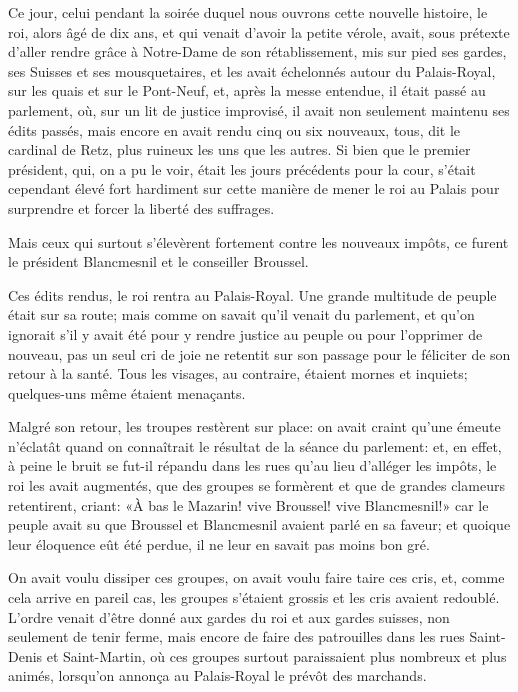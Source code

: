 Ce jour, celui pendant la soirée duquel nous ouvrons cette nouvelle histoire, le roi, alors âgé de dix ans, et qui venait d'avoir la petite vérole, avait, sous prétexte d'aller rendre grâce à Notre-Dame de son rétablissement, mis sur pied ses gardes, ses Suisses et ses mousquetaires, et les avait échelonnés autour du Palais-Royal, sur les quais et sur le Pont-Neuf, et, après la messe entendue, il était passé au parlement, où, sur un lit de justice improvisé, il avait non seulement maintenu ses édits passés, mais encore en avait rendu cinq ou six nouveaux, tous, dit le cardinal de Retz, plus ruineux les uns que les autres. Si bien que le premier président, qui, on a pu le voir, était les jours précédents pour la cour, s'était cependant élevé fort hardiment sur cette manière de mener le roi au Palais pour surprendre et forcer la liberté des suffrages.

Mais ceux qui surtout s'élevèrent fortement contre les nouveaux impôts, ce furent le président Blancmesnil et le conseiller Broussel.

Ces édits rendus, le roi rentra au Palais-Royal. Une grande multitude de peuple était sur sa route; mais comme on savait qu'il venait du parlement, et qu'on ignorait s'il y avait été pour y rendre justice au peuple ou pour l'opprimer de nouveau, pas un seul cri de joie ne retentit sur son passage pour le féliciter de son retour à la santé. Tous les visages, au contraire, étaient mornes et inquiets; quelques-uns même étaient menaçants.

Malgré son retour, les troupes restèrent sur place: on avait craint qu'une émeute n'éclatât quand on connaîtrait le résultat de la séance du parlement: et, en effet, à peine le bruit se fut-il répandu dans les rues qu'au lieu d'alléger les impôts, le roi les avait augmentés, que des groupes se formèrent et que de grandes clameurs retentirent, criant: «À bas le Mazarin! vive Broussel! vive Blancmesnil!» car le peuple avait su que Broussel et Blancmesnil avaient parlé en sa faveur; et quoique leur éloquence eût été perdue, il ne leur en savait pas moins bon gré.

On avait voulu dissiper ces groupes, on avait voulu faire taire ces cris, et, comme cela arrive en pareil cas, les groupes s'étaient grossis et les cris avaient redoublé. L'ordre venait d'être donné aux gardes du roi et aux gardes suisses, non seulement de tenir ferme, mais encore de faire des patrouilles dans les rues Saint-Denis et Saint-Martin, où ces groupes surtout paraissaient plus nombreux et plus animés, lorsqu'on annonça au Palais-Royal le prévôt des marchands.

